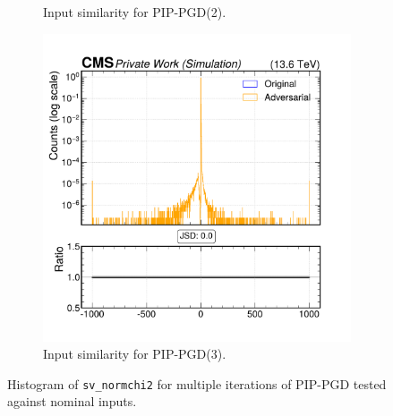 \begin{figure}[htbp]
\begin{subfigure}[t]{0.32\textwidth}
    \caption*{Input similarity for PIP-PGD(2).}
  \end{subfigure}\hfill
  \begin{subfigure}[t]{0.32\textwidth}
    \includegraphics[width=\linewidth]{media/output/features/compare/combined_it_3/cmp_vtx_arr_sv_normchi2.pdf}
    \caption*{Input similarity for PIP-PGD(3).}
  \end{subfigure}

  \caption*{Histogram of \texttt{sv\_normchi2} for multiple iterations of PIP-PGD tested against nominal inputs.}
  \label{fig:combined_input_sv_normchi2}
\end{figure}

